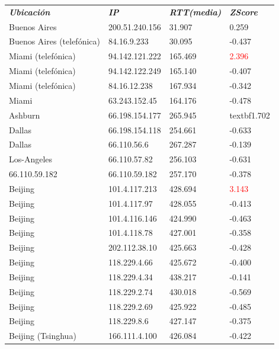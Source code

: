 \begin{tabular}{llll}
	\textit{\textbf{Ubicaci\'on}}	&	\textit{\textbf{IP}}	&	\textit{\textbf{RTT(media)}}	&	\textit{\textbf{ZScore}}	\\
	Buenos Aires	&	200.51.240.156	&	31.907	&	0.259	\\
	Buenos Aires (telef\'onica)	&	84.16.9.233	&	30.095	&	-0.437	\\
	Miami (telef\'onica)		&	94.142.121.222	&	165.469	&	\textcolor{red}{2.396}	\\
	Miami (telef\'onica)		&	94.142.122.249	&	165.140	&	-0.407	\\
	Miami (telef\'onica)		&	84.16.12.238	&	167.934	&	-0.342	\\
	Miami 			&	63.243.152.45	&	164.176	&	-0.478	\\
	Ashburn			&	66.198.154.177	&	265.945	&	textbf{1.702}	\\
	Dallas			&	66.198.154.118	&	254.661	&	-0.633	\\
	Dallas			&	66.110.56.6	&	267.287	&	-0.139	\\
	Los-Angeles		&	66.110.57.82	&	256.103	&	-0.631	\\
	66.110.59.182		&	66.110.59.182	&	257.170	&	-0.378	\\
	Beijing			&	101.4.117.213	&	428.694	&	\textcolor{red}{3.143}	\\
	Beijing			&	101.4.117.97	&	428.055	&	-0.413	\\
	Beijing			&	101.4.116.146	&	424.990	&	-0.463	\\
	Beijing			&	101.4.118.78	&	427.001	&	-0.358	\\
	Beijing			&	202.112.38.10	&	425.663	&	-0.428	\\
	Beijing			&	118.229.4.66	&	425.672	&	-0.400	\\
	Beijing			&	118.229.4.34	&	438.217	&	-0.141	\\
	Beijing			&	118.229.2.74	&	430.018	&	-0.569	\\
	Beijing			&	118.229.2.69	&	425.922	&	-0.485	\\
	Beijing			&	118.229.8.6	&	427.147	&	-0.375	\\
	Beijing (Tsinghua)		&	166.111.4.100	&	426.084	&	-0.422	\\

\end{tabular}

~

